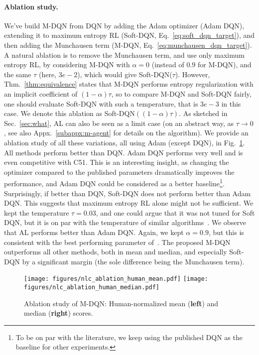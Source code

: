 \documentclass{article}
\begin{document}
\paragraph{Ablation study.} \label{subsec:ablatioen}
We've build M-DQN from DQN by adding the Adam optimizer (Adam DQN), extending it to maximum entropy RL (Soft-DQN, Eq.~\eqref{eq:soft_dqn_target}), and then adding the Munchausen term (M-DQN, Eq.~\eqref{eq:munchausen_dqn_target}). A natural ablation is to remove the Munchausen term, and use only maximum entropy RL, by considering M-DQN with $\alpha=0$ (instead of $0.9$ for M-DQN), and the same $\tau$ (here, $3e-2$), which would give Soft-DQN($\tau$). However, Thm.~\ref{thm:equivalence} states that M-DQN performs entropy regularization with an implicit coefficient of $(1-\alpha)\tau$, so to compare M-DQN and Soft-DQN fairly, one should evaluate Soft-DQN with such a temperature, that is $3e-3$ in this case. We denote this ablation as Soft-DQN$((1-\alpha)\tau)$.
As sketched in Sec.~\ref{sec:what}, AL can also be seen as a limit case (on an abstract way, as $\tau\rightarrow 0$, see also Appx.~\ref{subappx:m-agent} for details on the algorithm). 
We provide an ablation study of all these variations, all using Adam (except DQN), in Fig.~\ref{fig:ablation}.
All methods perform better than DQN. Adam DQN performs very well and is even competitive with C51. This is an interesting insight, as changing the optimizer compared to the published parameters dramatically improves the performance, and Adam DQN could be considered as a better baseline\footnote{To be on par with the literature, we keep using the published DQN as the baseline for other experiments.}. Surprisingly, if better than DQN, Soft-DQN does not perform better than Adam DQN. This suggests that maximum entropy RL alone might not be sufficient. We kept the temperature $\tau=0.03$, and one could argue that it was not tuned for Soft DQN, but it is on par with the temperature of similar algorithms~\cite{song2018revisiting,vieillard2020leverage}. We observe that AL performs better than Adam DQN. Again, we kept $\alpha=0.9$, but this is consistent with the best performing parameter of~\citet[\textit{e.g.},~Fig.~7]{bellemare2016increasing}. The proposed M-DQN outperforms all other methods, both in mean and median, and especially Soft-DQN by a significant margin (the sole difference being the Munchausen term).

\begin{figure}
    \centering
    \texttt{[image: figures/nlc\_ablation\_human\_mean.pdf]}
    \texttt{[image: figures/nlc\_ablation\_human\_median.pdf]}
    \caption{Ablation study of M-DQN: Human-normalized mean (\textbf{left}) and median (\textbf{right}) scores.}
    \label{fig:ablation}
\end{figure}
\end{document}
